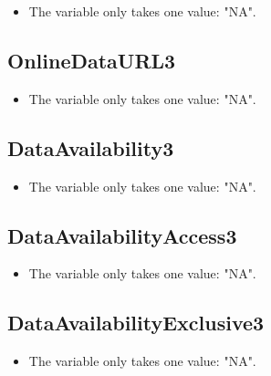 \documentclass[]{article}
\providecommand{\tightlist}{%
  \setlength{\itemsep}{0pt}\setlength{\parskip}{0pt}}
\newcommand{\fullline}{\noindent\makebox[\linewidth]{\rule{\textwidth}{0.4pt}}}
\begin{document}
\begin{itemize}
\tightlist
\item
  The variable only takes one value: "NA".
\end{itemize}

\fullline

\hypertarget{onlinedataurl3}{\subsection{OnlineDataURL3}\label{onlinedataurl3}}

\begin{itemize}
\tightlist
\item
  The variable only takes one value: "NA".
\end{itemize}

\fullline

\hypertarget{dataavailability3}{\subsection{DataAvailability3}\label{dataavailability3}}

\begin{itemize}
\tightlist
\item
  The variable only takes one value: "NA".
\end{itemize}

\fullline

\hypertarget{dataavailabilityaccess3}{\subsection{DataAvailabilityAccess3}\label{dataavailabilityaccess3}}

\begin{itemize}
\tightlist
\item
  The variable only takes one value: "NA".
\end{itemize}

\fullline

\hypertarget{dataavailabilityexclusive3}{\subsection{DataAvailabilityExclusive3}\label{dataavailabilityexclusive3}}

\begin{itemize}
\tightlist
\item
  The variable only takes one value: "NA".
\end{itemize}
\end{document}
